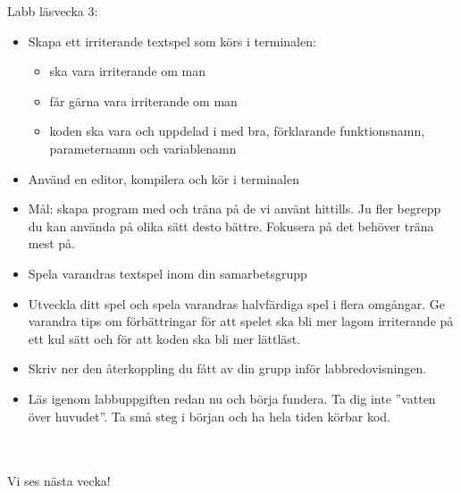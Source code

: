 \begin{SlideExtra}{Labb läsvecka 3:  \texttt{\LabWeekTHREE}}\SlideFontSmall
\begin{itemize}
\item Skapa ett  irriterande textspel som körs i terminalen:
\begin{itemize}\SlideFontTiny
  \item ska vara  irriterande om man 
  \item får gärna vara  irriterande om man 
  \item koden ska vara  och uppdelad i  med bra, förklarande funktionsnamn, parameternamn och variablenamn
\end{itemize}
\item Använd en editor, kompilera och kör i terminalen
\item Mål: skapa  program med  och träna på de  vi använt hittills. Ju fler begrepp du kan använda på olika sätt desto bättre. Fokusera på det  behöver träna mest på.
\item Spela varandras textspel inom din samarbetsgrupp
\item Utveckla ditt spel  och spela varandras halvfärdiga spel i flera omgångar. Ge varandra tips om förbättringar för att spelet ska bli mer lagom irriterande på ett kul sätt och för att koden ska bli mer lättläst.
\item Skriv ner den återkoppling du fått av din grupp inför labbredovisningen.
\item Läs igenom labbuppgiften redan nu och börja fundera. Ta dig inte ''vatten över huvudet''. Ta små steg i början och ha hela tiden körbar kod.


\end{itemize}
\end{SlideExtra}
\fi

\ifkompendium\else
\begin{SlideExtra}{}
  \Huge {} \\~\\ Vi ses nästa vecka!
\end{SlideExtra}
\fi 
